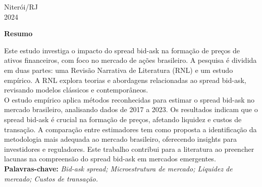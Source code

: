     \begin{center}
        Niterói/RJ\\[0.2cm]
        2024 
    \end{center}
    
    \newpage
    
    \begin{center}
        \textbf{\Large Resumo}\\[0.2cm]
    \end{center}
    
    
    
    \begin{flushleft}
        \setlength{\parskip}{1cm} %
        \linespread{1.5}\selectfont %
        \hspace*{0cm}\parbox{16.5cm}{
            Este estudo investiga o impacto do spread bid-ask na formação de preços de ativos financeiros, com foco no mercado de ações brasileiro. A pesquisa é dividida em duas partes: uma Revisão Narrativa de Literatura (RNL) e um estudo empírico. A RNL explora teorias e abordagens relacionadas ao spread bid-ask, revisando modelos clássicos e contemporâneos.
            \\O estudo empírico aplica métodos reconhecidas para estimar o spread bid-ask no mercado brasileiro, analisando dados de 2017 a 2023. Os resultados indicam que o spread bid-ask é crucial na formação de preços, afetando liquidez e custos de transação. A comparação entre estimadores tem como proposta a identificação da metodologia mais adequada ao mercado brasileiro, oferecendo insights para investidores e reguladores. Este trabalho contribui para a literatura ao preencher lacunas na compreensão do spread bid-ask em mercados emergentes.
            \\
            \linespread{1.5}\selectfont
            \textbf{Palavras-chave:} \textit{Bid-ask spread; Microestrutura de mercado; Liquidez de mercado; Custos de transação.}
        }
    \end{flushleft}
    \newpage
    
    
    
    
    
    
    
    
    
    
    
    \thispagestyle{empty}
    
        
    